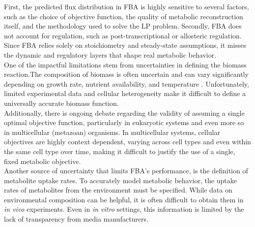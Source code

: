First, the predicted flux distribution in FBA is highly sensitive to several factors, such as the choice of objective function, the quality of metabolic reconstruction itself, and the methodology used to solve the LP problem. Secondly, FBA does not account for regulation, such as post-transcriptional or allosteric regulation. Since FBA relies solely on stoichiometry and steady-state assumptions, it misses the dynamic and regulatory layers that shape real metabolic behavior.
\\

One of the impactful limitations stem from uncertainties in defining the biomass reaction.The composition of biomass is often uncertain and can vary significantly depending on growth rate, nutrient availability, and temperature \citep{nookaewGenomescaleMetabolicModel2008,duarteReconstructionValidationSaccharomyces2004,cotnerTemperatureAffectsStoichiometry2006,carnicerMacromolecularElementalComposition2009}.
Unfortunately, limited experimental data and cellular heterogeneity make it difficult to define a universally accurate biomass function. 
\\

Additionally, there is ongoing debate regarding the validity of assuming a single optimal objective function, particularly in eukaryotic systems and even more so in multicellular (metazoan) organisms. In multicellular systems, cellular objectives are highly context dependent, varying across cell types and even within the same cell type over time, making it difficult to justify the use of a single, fixed metabolic objective.
\\

Another source of uncertainty that limits FBA’s performance, is the definition of metabolite uptake rates. To accurately model metabolic behavior, the uptake rates of metabolites from the environment must be specified. While data on environmental composition can be helpful, it is often difficult to obtain them in \textit{in vivo} experiments.
Even in \textit{in vitro} settings, this information is limited by the lack of transparency from media manufacturers.